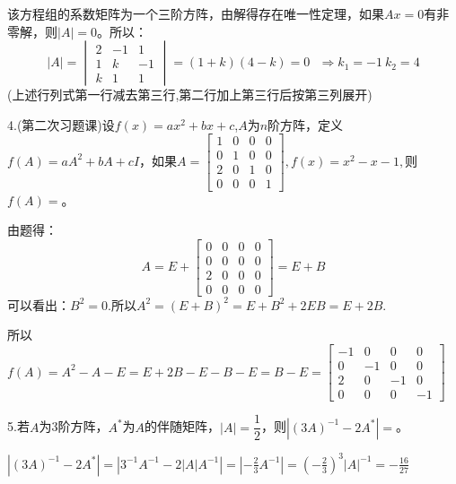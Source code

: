 \documentclass{article}
\begin{document}
\begin{jie}
该方程组的系数矩阵为一个三阶方阵，由解得存在唯一性定理，如果$Ax=0$有非零解，则$|A|=0$。所以：
\begin{equation*}
|A|=
\begin{vmatrix}
2 & -1 & 1 \\
1 & k &-1\\
k & 1 & 1
\end{vmatrix}=(1+k)(4-k)=0~~~\Rightarrow k_{1}=-1 ~k_{2}=4
\end{equation*}
(上述行列式第一行减去第三行,第二行加上第三行后按第三列展开)
\end{jie}

4.\textcolor[rgb]{0.50,0.00,0.00}{(第二次习题课)}设$f(x)=ax^{2}+bx+c$,$A$为$n$阶方阵，定义$f(A)=aA^{2}+bA+cI$，如果$
A=
\begin{bmatrix}
  1 & 0 & 0 & 0 \\
  0 & 1& 0& 0 \\
  2 & 0 & 1& 0\\
   0 & 0 &0 &1
\end{bmatrix},f(x)=x^{2}-x-1,
$则$f(A)=$\underline{\hphantom{~~~~~~~~~~}}。

\begin{jie}
由题得：
\begin{equation*}
A=E+\begin{bmatrix}
  0 & 0 & 0 & 0 \\
  0 & 0& 0& 0 \\
  2 & 0 & 0& 0\\
   0 & 0 &0 &0
\end{bmatrix}=E+B
\end{equation*}
可以看出：$B^2=0$.所以$A^2=(E+B)^2=E+B^2+2EB=E+2B$.

所以$f(A)=A^2-A-E=E+2B-E-B-E=B-E=
\begin{bmatrix}
  -1 & 0 & 0 & 0 \\
  0 & -1& 0& 0 \\
  2 & 0 & -1& 0\\
   0 & 0 &0 &-1
\end{bmatrix}
$
\end{jie}

5.若$A$为3阶方阵，$A^{*}$为$A$的伴随矩阵，$|A|=\dfrac{1}{2}$，则$\left|(3A)^{-1}-2A^{*}\right|=$\underline{\hphantom{~~~~~~~~~~}}。

\begin{jie}
$\left|(3A)^{-1}-2A^{*}\right|=\left|3^{-1}A^{-1}-2|A|A^{-1}\right|=\left|-\frac{2}{3}A^{-1}\right|=\left(-\frac{2}{3}\right)^{3}|A|^{-1}=-\frac{16}{27}$
\end{jie}
\end{document}
